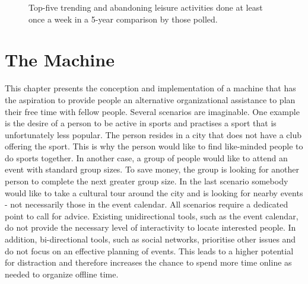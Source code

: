 \documentclass[12pt,numbers=noenddot,parskip,bibliography=totocnumbered,listof=totocnumbered]{scrreprt}
\begin{document}
\begin{figure}
\caption[Trending and abonding leisure activites]{Top-five trending and abandoning leisure activities done at least once a week in a 5-year comparison by those polled. \citep{freizeitmonitor2016}}
\label{topfivechangingleisureactivities}
\end{figure}

\chapter{The Machine}
This chapter presents the conception and implementation of a machine that has the aspiration to provide people an alternative organizational assistance to plan their free time with fellow people. Several scenarios are imaginable. One example is the desire of a person to be active in sports and practises a sport that is unfortunately less popular. The person resides in a city that does not have a club offering the sport. This is why the person would like to find like-minded people to do sports together. In another case, a group of people would like to attend an event with standard group sizes. To save money, the group is looking for another person to complete the next greater group size. In the last scenario somebody would like to take a cultural tour around the city and is looking for nearby events - not necessarily those in the event calendar. All scenarios require a dedicated point to call for advice. Existing unidirectional tools, such as the event calendar, do not provide the necessary level of interactivity to locate interested people. In addition, bi-directional tools, such as social networks, prioritise other issues and do not focus on an effective planning of events. This leads to a higher potential for distraction and therefore increases the chance to spend more time online as needed to organize offline time.
\end{document}
